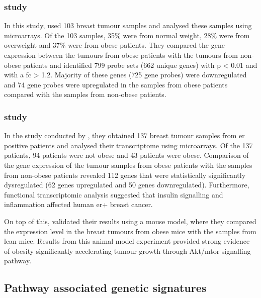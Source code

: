 \subsubsection{\citet{Creighton2012} study}
\label{ssub:creighton_study}

In this study, \citet{Creighton2012} used 103 breast tumour samples and analysed these samples using microarrays.
Of the 103 samples, 35\% were from normal weight, 28\% were from overweight and 37\% were from obese patients.
They compared the gene expression between the tumours from obese patients with the tumours from non-obese patients and identified 799 probe sets (662 unique genes) with p \textless{} 0.01 and with a \gls{fc} \textgreater{} 1.2.
Majority of these genes (725 gene probes) were downregulated and 74 gene probes were upregulated in the samples from obese patients compared with the samples from non-obese patients.

\subsubsection{\citet{Fuentes-Mattei2014} study}
\label{ssub:fuentes_mattei_study}

In the study conducted by \citet{Fuentes-Mattei2014}, they obtained 137 breast tumour samples from \gls{er} positive patients and analysed their transcriptome using microarrays.
Of the 137 patients, 94 patients were not obese and 43 patients were obese.
Comparison of the gene expression of the tumour samples from obese patients with the samples from non-obese patients revealed 112 genes that were statistically significantly dysregulated (62 genes upregulated and 50 genes downregulated).
Furthermore, functional transcriptomic analysis suggested that insulin signalling and inflammation affected human \gls{er}+ breast cancer.

On top of this, \citet{Fuentes-Mattei2014} validated their results using a mouse model, where they compared the expression level in the breast tumours from obese mice with the samples from lean mice.
Results from this animal model experiment provided strong evidence of obesity significantly accelerating tumour growth through Akt/\gls{mtor} signalling pathway.

\subsection{Pathway associated genetic signatures}
\label{sub:pathway_associated_genetic_signatures}


